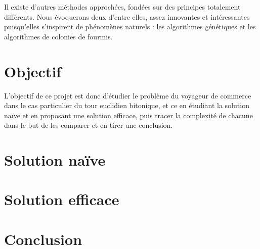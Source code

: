 \documentclass[12pt, openany]{report}
\begin{document}
Il existe d’autres méthodes approchées, fondées sur des principes totalement différents. Nous évoquerons deux d’entre elles, assez innovantes et intéressantes puisqu’elles s’inspirent de phénomènes naturels : les algorithmes génétiques et les algorithmes de colonies de fourmis.
\section{Objectif}
L'objectif de ce projet est donc d'étudier le problème du voyageur de commerce dans le cas particulier du tour euclidien bitonique, et ce en étudiant la solution naïve et en proposant une solution efficace, puis tracer la complexité de chacune dans le but de les comparer et en tirer une conclusion.
\section{Solution naïve}
\section{Solution efficace}
\section{Conclusion}
\end{document}
